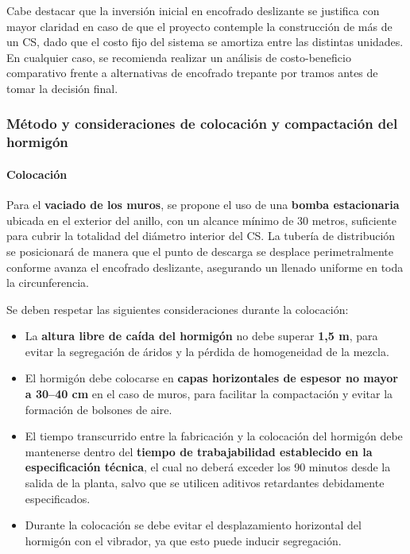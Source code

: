 Cabe destacar que la inversión inicial en encofrado deslizante se justifica con mayor claridad en caso de que el proyecto contemple la construcción de más de un CS, dado que el costo fijo del sistema se amortiza entre las distintas unidades. En cualquier caso, se recomienda realizar un análisis de costo-beneficio comparativo frente a alternativas de encofrado trepante por tramos antes de tomar la decisión final.

\subsubsection{Método y consideraciones de colocación y compactación del hormigón}

\paragraph{Colocación}

Para el \textbf{vaciado de los muros}, se propone el uso de una \textbf{bomba estacionaria} ubicada en el exterior del anillo, con un alcance mínimo de 30 metros, suficiente para cubrir la totalidad del diámetro interior del CS. La tubería de distribución se posicionará de manera que el punto de descarga se desplace perimetralmente conforme avanza el encofrado deslizante, asegurando un llenado uniforme en toda la circunferencia.

Se deben respetar las siguientes consideraciones durante la colocación:

\begin{itemize}
    \item La \textbf{altura libre de caída del hormigón} no debe superar \textbf{1{,}5 m}, para evitar la segregación de áridos y la pérdida de homogeneidad de la mezcla.
    \item El hormigón debe colocarse en \textbf{capas horizontales de espesor no mayor a 30--40 cm} en el caso de muros, para facilitar la compactación y evitar la formación de bolsones de aire.
    \item El tiempo transcurrido entre la fabricación y la colocación del hormigón debe mantenerse dentro del \textbf{tiempo de trabajabilidad establecido en la especificación técnica}, el cual no deberá exceder los 90 minutos desde la salida de la planta, salvo que se utilicen aditivos retardantes debidamente especificados.
    \item Durante la colocación se debe evitar el desplazamiento horizontal del hormigón con el vibrador, ya que esto puede inducir segregación.
\end{itemize}

